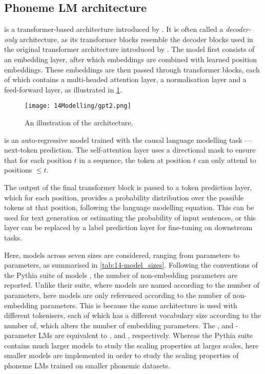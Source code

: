 \subsection{Phoneme LM architecture}\label{sec:14-phonemearchitecture}

\gpt is a transformer-based architecture introduced by \citet{radford-2019-gpt2}. It is often called a \emph{decoder-only} architecture, as its transformer blocks resemble the decoder blocks used in the original transformer architecture introduced by \citet{vaswani2017attention}. The model first consists of an embedding layer, after which embeddings are combined with learned position embeddings. These embeddings are then passed through transformer blocks, each of which contains a multi-headed attention layer, a normalisation layer and a feed-forward layer, as illustrated in \cref{fig:14-gpt2}.

\begin{figure}[t]
    \centering
    \texttt{[image: 14Modelling/gpt2.png]}
    \caption{An illustration of the \gpt architecture.}
    \label{fig:14-gpt2}
\end{figure}

\gpt is an auto-regressive model trained with the causal language modelling task --- next-token prediction. The self-attention layer uses a directional mask to ensure that for each position $t$ in a sequence, the token at position $t$ can only attend to positions $\leq t$.  

The output of the final transformer block is passed to a token prediction layer, which for each position, provides a probability distribution over the possible tokens at that position, following the language modelling equation. This can be used for text generation or estimating the probability of input sentences, or this layer can be replaced by a label prediction layer for fine-tuning on downstream tasks.

Here, \gpt models across seven sizes are considered, ranging from  parameters to  parameters, as summarised in \cref{tab:14-model_sizes}. Following the conventions of the Pythia suite of models \citep{biderman2023pythia}, the number of non-embedding parameters are reported. Unlike their suite, where models are named according to the number of parameters, here models are only referenced according to the number of non-embedding parameters. This is because the same architecture is used with different tokenisers, each of which has a different vocabulary size according to the number of, which alters the number of embedding parameters. The ,  and -parameter LMs are equivalent to ,  and , respectively. Whereas the Pythia suite contains much larger models to study the scaling properties at larger scales, here smaller models are implemented in order to study the scaling properties of phoneme LMs trained on smaller phonemic datasets.

